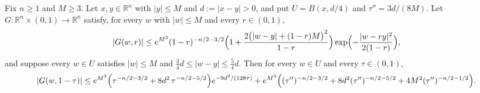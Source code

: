 \begin{lemma}
Fix $n \geq 1$ and $M \geq 3$.  Let $x,y \in \mathbb{R}^n$ with $|y| \leq M$ and
$d := |x-y| > 0$, and put $U = B(x,d/4)$ and $\tau'' = 3d/(8M)$.  Let
$G : \mathbb{R}^n \times (0,1) \to \mathbb{R}^n$ satisfy, for every $w$ with
$|w| \leq M$ and every $r \in (0,1)$,
\[
  |G(w,r)| \leq e^{M^2}(1-r)^{-n/2-3/2}
    \Bigl(1 + \frac{2\bigl(|w-y|+(1-r)M\bigr)^2}{1-r}\Bigr)
    \exp\Bigl(-\frac{|w-ry|^2}{2(1-r)}\Bigr) ,
\]
and suppose every $w \in U$ satisfies $|w| \leq M$ and
$\tfrac34 d \leq |w-y| \leq \tfrac54 d$.  Then for every $w \in U$ and every
$\tau \in (0,1)$,
\[
  |G(w,1-\tau)|
    \leq e^{M^2}\Bigl(\tau^{-n/2-3/2} + 8d^2\,\tau^{-n/2-5/2}\Bigr)
        e^{-9d^2/(128\tau)}
      + e^{M^2}\Bigl((\tau'')^{-n/2-3/2} + 8d^2(\tau'')^{-n/2-5/2}
        + 4M^2(\tau'')^{-n/2-1/2}\Bigr) .
\]
\end{lemma}
